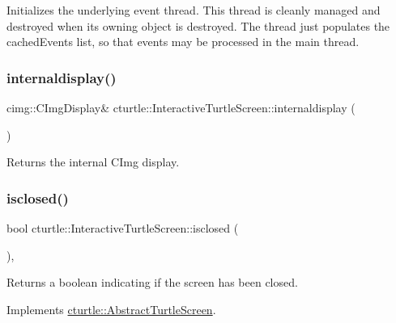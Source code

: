 Initializes the underlying event thread. This thread is cleanly managed and destroyed when its owning object is destroyed. The thread just populates the cached\+Events list, so that events may be processed in the main thread. \mbox{\label{classcturtle_1_1InteractiveTurtleScreen_a0ea57bab0cb93f0fa4629747bddbab30}} 
\subsubsection{\texorpdfstring{internaldisplay()}{internaldisplay()}}
{\footnotesize\ttfamily cimg\+::\+C\+Img\+Display\& cturtle\+::\+Interactive\+Turtle\+Screen\+::internaldisplay (\begin{DoxyParamCaption}{ }\end{DoxyParamCaption})\hspace{0.3cm}{\ttfamily [inline]}}

Returns the internal C\+Img display. \mbox{\label{classcturtle_1_1InteractiveTurtleScreen_ab1809a5a10cb3afaa330d6ba2ee5bb49}} 
\subsubsection{\texorpdfstring{isclosed()}{isclosed()}}
{\footnotesize\ttfamily bool cturtle\+::\+Interactive\+Turtle\+Screen\+::isclosed (\begin{DoxyParamCaption}{ }\end{DoxyParamCaption})\hspace{0.3cm}{\ttfamily [inline]}, {\ttfamily [virtual]}}

Returns a boolean indicating if the screen has been closed. 

Implements \hyperlink{classcturtle_1_1AbstractTurtleScreen}{cturtle\+::\+Abstract\+Turtle\+Screen}.

\mbox{\label{classcturtle_1_1InteractiveTurtleScreen_a0b6a0f18333312f7d502b3d9a511143e}} 
